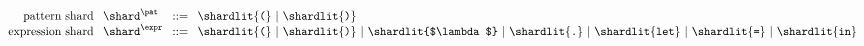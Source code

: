 \begin{figure}[h]
  \[\arraycolsep=4pt\begin{array}{rlrl}
    \text{pattern shard} & \shard^{\pat} & ::= &
      \shardlit{\texttt{(}} ~\vert~
      \shardlit{\texttt{)}} \\
    \text{expression shard} & \shard^{\expr} & ::= &
      \shardlit{\texttt{(}} ~\vert~
      \shardlit{\texttt{)}} ~\vert~
      \shardlit{$\lambda$} ~\vert~
      \shardlit{\texttt{.}} ~\vert~
      \shardlit{\texttt{let}} ~\vert~
      \shardlit{\texttt{=}} ~\vert~
      \shardlit{\texttt{in}}
  \end{array}\]
\end{figure}
